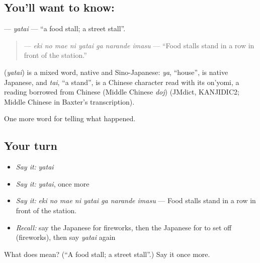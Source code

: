 \subsection*{You'll want to know: }
\textbf{} — \emph{yatai} — \textquotedblleft{}a food stall; a street stall\textquotedblright{}.

\begin{quote}
\textbf{   } — \emph{eki no mae ni yatai ga narande imasu} — \textquotedblleft{}Food stalls stand in a row in front of the station.\textquotedblright{}
\end{quote}

\begin{cousinweb}
\textbf{} (\emph{yatai}) is a mixed word, native and Sino-Japanese: \emph{ya}, \textquotedblleft{}house\textquotedblright{}, is native Japanese, and \emph{tai}, \textquotedblleft{}a stand\textquotedblright{}, is a Chinese character read with its on'yomi, a reading borrowed from Chinese (Middle Chinese \emph{doj}) (JMdict, KANJIDIC2; Middle Chinese in Baxter's transcription).
\end{cousinweb}

\begin{grammarlens}[title={What you've built}]
One more word for telling what happened.
\end{grammarlens}

\subsection*{Your turn}
\begin{itemize}
\raggedright
  \item \emph{Say it:} \emph{yatai}
  \item \emph{Say it:} \emph{yatai}, once more
  \item \emph{Say it:} \emph{eki no mae ni yatai ga narande imasu} — Food stalls stand in a row in front of the station.
  \item \emph{Recall:} say the Japanese for fireworks, then the Japanese for to set off (fireworks), then say \emph{yatai} again
\end{itemize}

\begin{tcolorbox}[breakable,colback=teal!4,colframe=teal!35!black,title={Before you move on}]
What does  mean? (\textquotedblleft{}A food stall; a street stall\textquotedblright{}.) Say it once more.
\end{tcolorbox}
